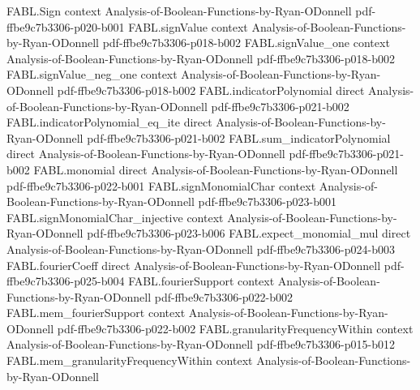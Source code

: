 \begin{theorem}
\label{FABL.fourierCoeff_majority_of_odd_arity_of_card_eq_odd}
\leanok
{}
\proofstep
  {FABL.Sign}
  {context}
  {Analysis-of-Boolean-Functions-by-Ryan-ODonnell}
  {pdf-ffbe9c7b3306-p020-b001}
\proofstep
  {FABL.signValue}
  {context}
  {Analysis-of-Boolean-Functions-by-Ryan-ODonnell}
  {pdf-ffbe9c7b3306-p018-b002}
\proofstep
  {FABL.signValue_one}
  {context}
  {Analysis-of-Boolean-Functions-by-Ryan-ODonnell}
  {pdf-ffbe9c7b3306-p018-b002}
\proofstep
  {FABL.signValue_neg_one}
  {context}
  {Analysis-of-Boolean-Functions-by-Ryan-ODonnell}
  {pdf-ffbe9c7b3306-p018-b002}
\proofstep
  {FABL.indicatorPolynomial}
  {direct}
  {Analysis-of-Boolean-Functions-by-Ryan-ODonnell}
  {pdf-ffbe9c7b3306-p021-b002}
\proofstep
  {FABL.indicatorPolynomial_eq_ite}
  {direct}
  {Analysis-of-Boolean-Functions-by-Ryan-ODonnell}
  {pdf-ffbe9c7b3306-p021-b002}
\proofstep
  {FABL.sum_indicatorPolynomial}
  {direct}
  {Analysis-of-Boolean-Functions-by-Ryan-ODonnell}
  {pdf-ffbe9c7b3306-p021-b002}
\proofstep
  {FABL.monomial}
  {direct}
  {Analysis-of-Boolean-Functions-by-Ryan-ODonnell}
  {pdf-ffbe9c7b3306-p022-b001}
\proofstep
  {FABL.signMonomialChar}
  {context}
  {Analysis-of-Boolean-Functions-by-Ryan-ODonnell}
  {pdf-ffbe9c7b3306-p023-b001}
\proofstep
  {FABL.signMonomialChar_injective}
  {context}
  {Analysis-of-Boolean-Functions-by-Ryan-ODonnell}
  {pdf-ffbe9c7b3306-p023-b006}
\proofstep
  {FABL.expect_monomial_mul}
  {direct}
  {Analysis-of-Boolean-Functions-by-Ryan-ODonnell}
  {pdf-ffbe9c7b3306-p024-b003}
\proofstep
  {FABL.fourierCoeff}
  {direct}
  {Analysis-of-Boolean-Functions-by-Ryan-ODonnell}
  {pdf-ffbe9c7b3306-p025-b004}
\proofstep
  {FABL.fourierSupport}
  {context}
  {Analysis-of-Boolean-Functions-by-Ryan-ODonnell}
  {pdf-ffbe9c7b3306-p022-b002}
\proofstep
  {FABL.mem_fourierSupport}
  {context}
  {Analysis-of-Boolean-Functions-by-Ryan-ODonnell}
  {pdf-ffbe9c7b3306-p022-b002}
\proofstep
  {FABL.granularityFrequencyWithin}
  {context}
  {Analysis-of-Boolean-Functions-by-Ryan-ODonnell}
  {pdf-ffbe9c7b3306-p015-b012}
\proofstep
  {FABL.mem_granularityFrequencyWithin}
  {context}
  {Analysis-of-Boolean-Functions-by-Ryan-ODonnell}

\end{theorem}
